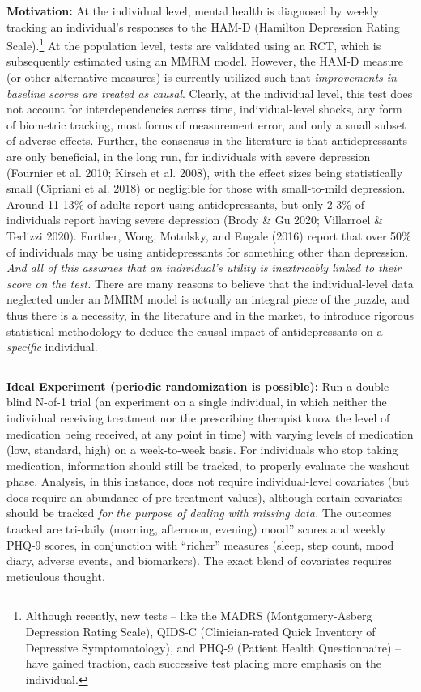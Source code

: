 \documentclass[12pt,letterpaper,doublespace, oneside]{article}
\begin{document}
\noindent
\textbf{Motivation:} At the individual level, mental health is diagnosed by weekly tracking an individual’s responses to the HAM-D (Hamilton Depression Rating Scale).\footnote{Although recently, new tests -- like the MADRS (Montgomery-Asberg Depression Rating Scale), QIDS-C (Clinician-rated Quick Inventory of Depressive Symptomatology), and PHQ-9 (Patient Health Questionnaire) -- have gained traction, each successive test placing more emphasis on the individual.} At the population level, tests are validated using an RCT, which is subsequently estimated using an MMRM model. However, the HAM-D measure (or other alternative measures) is currently utilized such that \emph{improvements in baseline scores are treated as causal}. Clearly, at the individual level, this test does not account for interdependencies across time, individual-level shocks, any form of biometric tracking, most forms of measurement error, and only a small subset of adverse effects. Further, the consensus in the literature is that antidepressants are only beneficial, in the long run, for individuals with severe depression (Fournier et al. 2010; Kirsch et al. 2008), with the effect sizes being statistically small (Cipriani et al. 2018) or negligible for those with small-to-mild depression. Around 11-13\% of adults report using antidepressants, but only 2-3\% of individuals report having severe depression (Brody \& Gu 2020; Villarroel \& Terlizzi 2020). Further, Wong, Motulsky, and Eugale (2016) report that over 50\% of individuals may be using antidepressants for something other than depression. \emph{And all of this assumes that an individual’s utility is inextricably linked to their score on the test.} There are many reasons to believe that the individual-level data neglected under an MMRM model is actually an integral piece of the puzzle, and thus there is a necessity, in the literature and in the market, to introduce rigorous statistical methodology to deduce the causal impact of antidepressants on a \emph{specific} individual. 

\noindent\rule{\linewidth}{0.4pt}

\noindent
\textbf{Ideal Experiment (periodic randomization is possible):} Run a double-blind N-of-1 trial (an experiment on a single individual, in which neither the individual receiving treatment nor the prescribing therapist know the level of medication being received, at any point in time) with varying levels of medication (low, standard, high) on a week-to-week basis. For individuals who stop taking medication, information should still be tracked, to properly evaluate the washout phase. Analysis, in this instance, does not require individual-level covariates (but does require an abundance of pre-treatment values), although certain covariates should be tracked \emph{for the purpose of dealing with missing data.} The outcomes tracked are tri-daily (morning, afternoon, evening) mood'' scores and weekly PHQ-9 scores, in conjunction with “richer” measures (sleep, step count, mood diary, adverse events, and biomarkers). The exact blend of covariates requires meticulous thought. 
\end{document}
